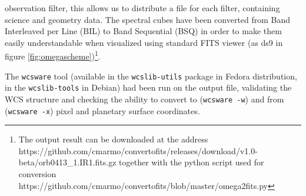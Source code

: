 observation filter, this allows
us to distribute a file for each filter, containing science and geometry data.
The spectral cubes have been converted from Band Interleaved per Line (BIL) to Band
Sequential (BSQ) in order to make them easily understandable when visualized using
standard FITS viewer (as ds9 in figure \ref{fig:omegascheme})\footnote{The output result can be downloaded at the address https://github.com/cmarmo/convertofits/releases/download/v1.0-beta/orb0413\_1.IR1.fits.gz together with the python script used for conversion https://github.com/cmarmo/convertofits/blob/master/omega2fits.py}.

The \texttt{wcsware} tool (available in the \texttt{wcslib-utils} package in Fedora
distribution, in the \texttt{wcslib-tools} in Debian) had been run on the output file,
validating the WCS structure and checking the ability to convert to
(\texttt{wcsware -w}) and from (\texttt{wcsware -x}) pixel and planetary surface
coordinates.

